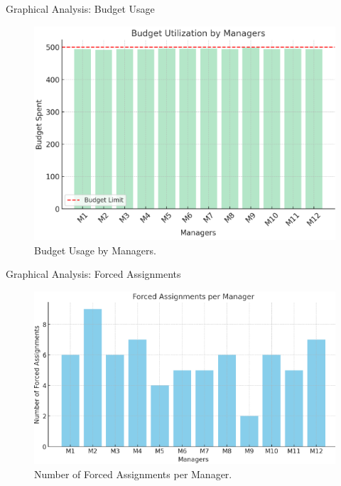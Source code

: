 \documentclass{beamer}
\begin{document}
	\begin{frame}{Graphical Analysis: Budget Usage}
		\begin{figure}[H]
			\centering
			\includegraphics[width=0.8\linewidth]{plot/budget_usage.png}
			\caption{Budget Usage by Managers.}
		\end{figure}
	\end{frame}
	
	\begin{frame}{Graphical Analysis: Forced Assignments}
		\begin{figure}[H]
			\centering
			\includegraphics[width=0.8\linewidth]{plot/forced_assignments.png}
			\caption{Number of Forced Assignments per Manager.}
		\end{figure}
	\end{frame}
	
\end{document}
